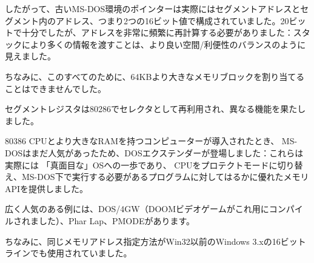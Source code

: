 したがって、古いMS-DOS環境のポインターは実際にはセグメントアドレスとセグメント内のアドレス、つまり2つの16ビット値で構成されていました。20ビットで十分でしたが、アドレスを非常に頻繁に再計算する必要がありました：スタックにより多くの情報を渡すことは、より良い空間/利便性のバランスのように見えました。

ちなみに、このすべてのために、64KBより大きなメモリブロックを割り当てることはできませんでした。


セグメントレジスタは80286でセレクタとして再利用され、異なる機能を果たしました。


80386 CPUとより大きな\ac{RAM}を持つコンピューターが導入されたとき、
MS-DOSはまだ人気があったため、DOSエクステンダーが登場しました：これらは実際には
「真面目な」\ac{OS}への一歩であり、
CPUをプロテクトモードに切り替え、MS-DOS下で実行する必要があるプログラムに対してはるかに優れたメモリ\ac{API}を提供しました。

広く人気のある例には、DOS/4GW（DOOMビデオゲームがこれ用にコンパイルされました）、Phar Lap、PMODEがあります。
\par
{}

ちなみに、同じメモリアドレス指定方法がWin32以前のWindows 3.xの16ビットラインでも使用されていました。